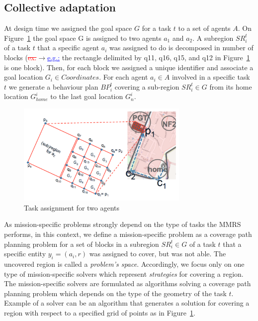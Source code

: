 \documentclass[journal]{IEEEtran}
\theoremstyle{definition}
\newcommand{\ra}{$\rightarrow$}
\newcommand{\chg}[2]{\textcolor{red}{\sout{#1}}{\ra}\textcolor{blue}{\uline{#2}}} %
\newcommand\patrizio[1]{\nb{Patrizio}{#1}}
\begin{document}
\subsection{Collective adaptation}
At design time we assigned the goal space $G$ for a task $t$ to a set of agents $A$. On Figure~\ref{Fig:Synthesis} the goal space G\patrizio{G or $G$?} is assigned to two agents $a_1$ and $a_2$. A subregion $SR^t_i$ of a task $t$ that a specific agent $a_i$  was assigned to do is decomposed in number of blocks (\chg{ex.}{e.g.:} the rectangle delimited by q11\patrizio{better $q11$}, q16, q15, and q12 in Figure~\ref{Fig:Synthesis} is one block).
Then, for each block we assigned a unique identifier and associate a goal location $G_i \in Coordinates$. 
For each agent $a_i \in A$ involved in a specific task $t$ we generate a  behaviour plan $BP^t_i$ covering a sub-region $SR^t_i \in G$ from its home location $G^i_{home}$ to the last goal location $G^i_n$. 

\begin{figure}[h]
\includegraphics[width=3.25in]{Figures/Synthesis2.png}
\caption{Task assignment for two agents}\label{Fig:Synthesis}
\end{figure}



 As mission-specific problems strongly depend on the type of tasks the MMRS performs, in this context, we define a mission-specific problem as a coverage path planning problem for a set of blocks in a subregion $SR^t_i \in G$ of a task $t$ that a specific entity $y_i=(a_i,r)$  was assigned to cover, but was not able. The uncovered region is called a \textit{problem's space}.
Accordingly, we focus only on one type of mission-specific solvers which represent \textit{strategies} for covering a region. The mission-specific solvers are formulated as algorithms solving a coverage path planning problem which depends on the type of the geometry of the task $t$. Example of a solver can be an algorithm that generates a solution for covering a region with respect to a specified grid of points as in Figure~\ref{Fig:Synthesis}.
\end{document}
